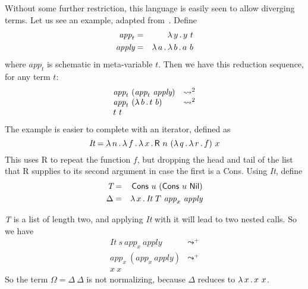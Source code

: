 \documentclass{article}
\begin{document}
\noindent Without some further restriction, this language is
easily seen to allow diverging terms.  Let us see an example, adapted
from~\cite{alves10}.  Define
\begin{eqnarray*}
  \textit{app}_t & = & \lambda\, y\, .\, y\ t \\
  \textit{apply} & = & \lambda\, a\, .\, \lambda\, b\, .\, a\ b \\
\end{eqnarray*}
\noindent where $\textit{app}_t$ is schematic in meta-variable $t$. Then we have this reduction sequence, for any term $t$:
\[
\begin{array}{ll}
  \textit{app}_t\ (\textit{app}_t\ \textit{apply}) & \leadsto^2 \\
  \textit{app}_t\ (\lambda\, b\, .\, t\ b) & \leadsto^2 \\
  t\ t& \
  \end{array}
\]
\noindent The example is easier to complete with an iterator, defined as
\[
\textit{It} = \lam{n}{\lam{f}{\lam{x}{\mathsf{R}\ n\ (\lam{q}{\lam{r}{f}})\ x}}}
\]
\noindent This uses \textsf{R} to repeat the function $f$, but dropping the head
and tail of the list that \textsf{R} supplies to its second argument in case the first is a \textsf{Cons}.  Using \textit{It}, define
\begin{eqnarray*}
\textit{T} & = & \mathsf{Cons}\ u\ (\mathsf{Cons}\ u\ \mathsf{Nil}) \\
\Delta & = & \lam{x}{\textit{It}\ T\ \textit{app}_x\ \textit{apply}}
\end{eqnarray*}

\noindent \textit{T} is a list of length two, and applying \textit{It} with it
will lead to two nested calls.  So we have
\[
\begin{array}{ll}
  \textit{It}\ s\ \textit{app}_x\ \textit{apply} & \leadsto^+ \\
  \textit{app}_x\ (\textit{app}_x\ \textit{apply}) & \leadsto^+ \\
  x\ x& \
\end{array}
\]
\noindent So the term $\Omega = \Delta\ \Delta$ is not normalizing, 
because $\Delta$ reduces to $\lambda\, x\, .\, x\ x$.
\end{document}
